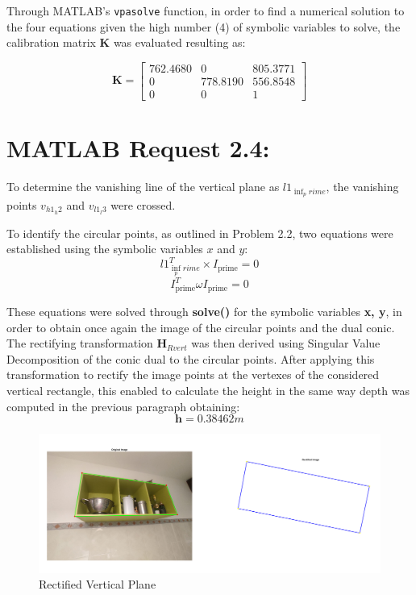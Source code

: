 \documentclass{Configuration_Files/PoliMi3i_thesis}
\begin{document}
Through MATLAB's \texttt{vpasolve} function, in order to find a numerical solution to the four equations given the high number (4) of symbolic variables to solve, the calibration matrix \textbf{K} was evaluated resulting as:

\[
\mathbf{K} = \begin{bmatrix}
762.4680 & 0 & 805.3771 \\
0 & 778.8190 & 556.8548 \\
0 & 0 & 1
\end{bmatrix}
\]



\newpage
\section{MATLAB Request 2.4: }
To determine the vanishing line of the vertical plane as \( l1_{\inf_prime} \), the vanishing points \( v_{h1_h2} \) and \( v_{l1_l3} \) were crossed. 

To identify the circular points, as outlined in Problem 2.2, two equations were established using the symbolic variables \(x\) and \(y\):
\[
l1_{\inf_prime}^{T} \times I_{\text{prime}} = 0
\]
\[
I_{\text{prime}}^{T} \omega I_{\text{prime}} = 0
\]

These equations were solved through \textbf{solve()} for the symbolic variables \textbf{x, y}, in order to obtain once again the image of the circular points and the dual conic.
The rectifying transformation $\mathbf{H}_{Rvert}$ was then derived using Singular Value Decomposition of the conic dual to the circular points. After applying this transformation to rectify the image points at the vertexes of the considered vertical rectangle, this enabled to calculate the height in the same way depth was computed in the previous paragraph obtaining:
\[
\mathbf{h} = 0.38462 m
\]
\begin{figure}[H]
    \centering
    \includegraphics[width=0.9\linewidth]{Project Template/Images/point4.png}
    \caption{Rectified Vertical Plane}
    \label{fig:enter-label}
\end{figure}
\end{document}
